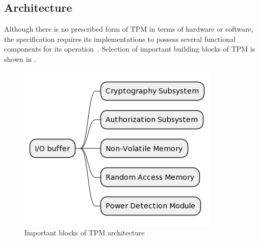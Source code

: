 \subsection{Architecture}
Although there is no prescribed form of TPM in terms of hardware or software, the specification requires its implementations to possess several functional components for its operation~\cite{tcg_p1_architecture}. Selection of important building blocks of TPM is shown in .

\begin{figure}[H]
    \centering
    \includegraphics[width=\textwidth-6cm]{img/tpm-arch-diagram.png}
    \caption{Important blocks of TPM architecture}
    \label{fig:tpm-arch-scheme}
\end{figure}

